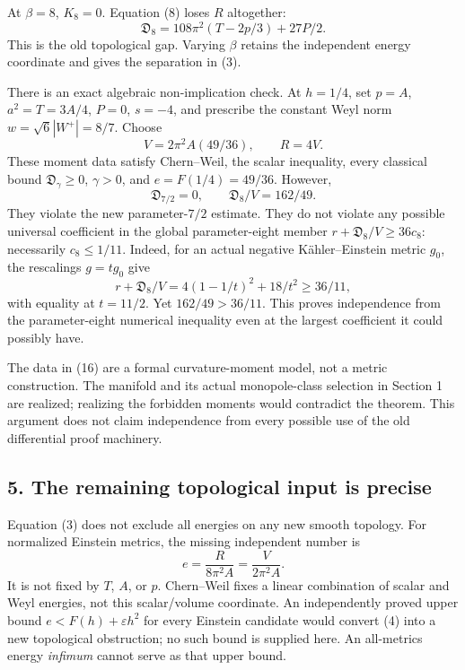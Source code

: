 \documentclass[
  11pt,
]{article}
\begin{document}
At \(\beta=8\), \(K_8=0\). Equation (8) loses \(R\) altogether: \[
 \mathfrak D_8=108\pi^2(T-2p/3)+27P/2.
 \tag{15}
\] This is the old topological gap. Varying \(\beta\) retains the
independent energy coordinate and gives the separation in (3).

There is an exact algebraic non-implication check. At \(h=1/4\), set
\(p=A\), \(a^2=T=3A/4\), \(P=0\), \(s=-4\), and prescribe the constant
Weyl norm \(w=\sqrt6|W^+|=8/7\). Choose \[
 V=2\pi^2A(49/36),\qquad R=4V.
\] These moment data satisfy Chern--Weil, the scalar inequality, every
classical bound \(\mathfrak D_\gamma\ge0\), \(\gamma>0\), and
\(e=F(1/4)=49/36\). However, \[
 \mathfrak D_{7/2}=0,\qquad \mathfrak D_8/V=162/49.
 \tag{16}
\] They violate the new parameter-\(7/2\) estimate. They do not violate
any possible universal coefficient in the global parameter-eight member
\(r+\mathfrak D_8/V\ge36c_8\): necessarily \(c_8\le1/11\). Indeed, for
an actual negative Kähler--Einstein metric \(g_0\), the rescalings
\(g=tg_0\) give \[
 r+\mathfrak D_8/V=4(1-1/t)^2+18/t^2
 \ge36/11,
\] with equality at \(t=11/2\). Yet \(162/49>36/11\). This proves
independence from the parameter-eight numerical inequality even at the
largest coefficient it could possibly have.

The data in (16) are a formal curvature-moment model, not a metric
construction. The manifold and its actual monopole-class selection in
Section 1 are realized; realizing the forbidden moments would contradict
the theorem. This argument does not claim independence from every
possible use of the old differential proof machinery.

\hypertarget{the-remaining-topological-input-is-precise}{%
\subsection{5. The remaining topological input is
precise}\label{the-remaining-topological-input-is-precise}}

Equation (3) does not exclude all energies on any new smooth topology.
For normalized Einstein metrics, the missing independent number is \[
 e=\frac{R}{8\pi^2A}=\frac{V}{2\pi^2A}.
 \tag{17}
\] It is not fixed by \(T\), \(A\), or \(p\). Chern--Weil fixes a linear
combination of scalar and Weyl energies, not this scalar/volume
coordinate. An independently proved upper bound
\(e<F(h)+\varepsilon h^2\) for every Einstein candidate would convert
(4) into a new topological obstruction; no such bound is supplied here.
An all-metrics energy \emph{infimum} cannot serve as that upper bound.
\end{document}
